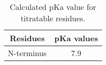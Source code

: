 \begin{appendices}
\renewcommand{\thefigure}{A\arabic{figure}}
\renewcommand{\thetable}{A\arabic{table}}

\begin{table}{ \qquad \qquad \qquad \qquad \qquad \qquad  }
    \begin{tabular}{ c| c  }
     \hline
 Residues &   pKa values  \\ \hline
 N-terminus & 7.9        \\ 
 \hline
    \end{tabular}
     \caption{Calculated pKa value for titratable residues.}
     \label{TabelTitratableRes}
\end{table}

\end{appendices}



